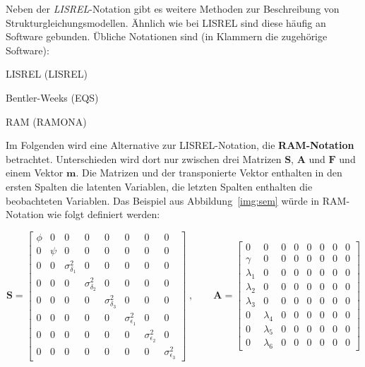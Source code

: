 \documentclass{article}
\numberwithin{equation}{section}
\begin{document}
Neben der \emph{LISREL}-Notation gibt es weitere Methoden zur Beschreibung von Strukturgleichungsmodellen. Ähnlich wie bei LISREL sind diese häufig an Software gebunden. Übliche Notationen sind (in Klammern die zugehörige Software):

\begin{compactitem}
\item LISREL (LISREL)
\item Bentler-Weeks (EQS)
\item RAM (RAMONA)
\end{compactitem}

Im Folgenden wird eine Alternative zur LISREL-Notation, die \textbf{RAM-Notation} betrachtet. Unterschieden wird dort nur zwischen drei Matrizen $\mathbf{S}$, $\mathbf{A}$ und $\mathbf{F}$ und einem Vektor $\mathbf{m}$. Die Matrizen und der transponierte Vektor enthalten in den ersten Spalten die latenten Variablen, die letzten Spalten enthalten die beobachteten Variablen. Das Beispiel aus Abbildung~\ref{img:sem} würde in RAM-Notation wie folgt definiert werden:

\begin{equation}
\mathbf{S} = \begin{bmatrix}
\phi & 0 & 0 & 0 & 0 & 0 & 0 & 0\\
0 & \psi & 0 & 0 & 0 & 0 & 0 & 0\\
0 & 0 & \sigma^2_{\delta_1} & 0 & 0 & 0 & 0 & 0\\
0 & 0 & 0 & \sigma^2_{\delta_2} & 0 & 0 & 0 & 0\\
0 & 0 & 0 & 0 & \sigma^2_{\delta_3} & 0 & 0 & 0\\
0 & 0 & 0 & 0 & 0 & \sigma^2_{\epsilon_1} & 0 & 0\\
0 & 0 & 0 & 0 & 0 & 0 & \sigma^2_{\epsilon_2} & 0\\
0 & 0 & 0 & 0 & 0 & 0 & 0 & \sigma^2_{\epsilon_3}
\end{bmatrix}\;,\qquad
\mathbf{A} = \begin{bmatrix}
0 & 0 & 0 & 0 & 0 & 0 & 0 & 0\\
\gamma & 0 & 0 & 0 & 0 & 0 & 0 & 0\\
\lambda_1 & 0 & 0 & 0 & 0 & 0 & 0 & 0\\
\lambda_2 & 0 & 0 & 0 & 0 & 0 & 0 & 0\\
\lambda_3 & 0 & 0 & 0 & 0 & 0 & 0 & 0\\
0 & \lambda_4 & 0 & 0 & 0 & 0 & 0 & 0\\
0 & \lambda_5 & 0 & 0 & 0 & 0 & 0 & 0\\
0 & \lambda_6 & 0 & 0 & 0 & 0 & 0 & 0
\end{bmatrix}
\end{equation}
\end{document}
